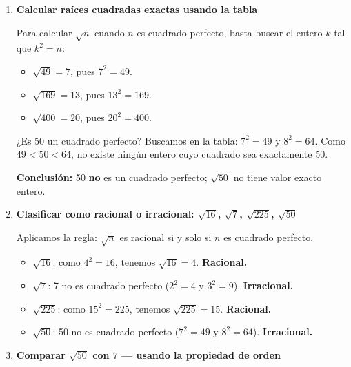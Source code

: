 \documentclass[11pt, letterpaper]{article}
\begin{document}
\begin{tcolorbox}[examplebox, title={Ejemplos}]
\begin{enumerate}[label=\textbf{Ej. \arabic*.}, leftmargin=*, itemsep=18pt]

\item \textbf{Calcular raíces cuadradas exactas usando la tabla}

Para calcular $\sqrt{n}$ cuando $n$ es cuadrado perfecto, basta buscar el entero $k$ tal que $k^2 = n$:

\medskip
\begin{itemize}[itemsep=4pt]
  \item $\sqrt{49} = 7$, \quad pues $7^2 = 49$. \hfill\checkmark
  \item $\sqrt{169} = 13$, \quad pues $13^2 = 169$. \hfill\checkmark
  \item $\sqrt{400} = 20$, \quad pues $20^2 = 400$. \hfill\checkmark
\end{itemize}

\medskip
¿Es 50 un cuadrado perfecto? Buscamos en la tabla: $7^2 = 49$ y $8^2 = 64$.
Como $49 < 50 < 64$, no existe ningún entero cuyo cuadrado sea exactamente 50.

\medskip
\textbf{Conclusión:} 50 \textbf{no} es un cuadrado perfecto; $\sqrt{50}$ no tiene valor exacto entero.

\item \textbf{Clasificar como racional o irracional: $\sqrt{16}$, $\sqrt{7}$, $\sqrt{225}$, $\sqrt{50}$}

Aplicamos la regla: $\sqrt{n}$ es racional si y solo si $n$ es cuadrado perfecto.

\medskip
\begin{itemize}[itemsep=4pt]
  \item $\sqrt{16}$: como $4^2 = 16$, tenemos $\sqrt{16} = 4$. \quad\textbf{Racional.}
  \item $\sqrt{7}$: 7 no es cuadrado perfecto ($2^2=4$ y $3^2=9$). \quad\textbf{Irracional.}
  \item $\sqrt{225}$: como $15^2 = 225$, tenemos $\sqrt{225} = 15$. \quad\textbf{Racional.}
  \item $\sqrt{50}$: 50 no es cuadrado perfecto ($7^2=49$ y $8^2=64$). \quad\textbf{Irracional.}
\end{itemize}

\item \textbf{Comparar $\sqrt{50}$ con $7$ — usando la propiedad de orden}


\end{enumerate}
\end{tcolorbox}
\end{document}
